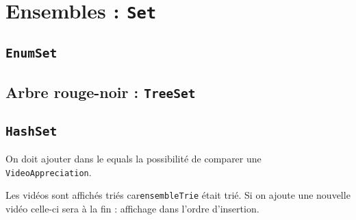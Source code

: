 \documentclass[12pt,a4paper,openany]{book}
\begin{document}
	\chapter{Ensembles : \texttt{Set}}
	\section{\texttt{EnumSet}}
		
	\section{Arbre rouge-noir : \texttt{TreeSet}}
		
		
	\section{\texttt{HashSet}}
		
		
		

	On doit ajouter dans le equals la possibilité de comparer une \texttt{VideoAppreciation}.
		
		
	Les vidéos sont affichés triés car\texttt{ensembleTrie} était trié. Si on ajoute une nouvelle vidéo celle-ci sera à la fin : affichage dans
	l'ordre d'insertion.

	\appendix
	\lstlistoflistings
\end{document}
